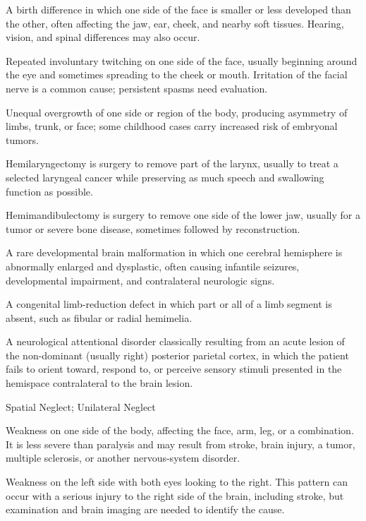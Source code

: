  A birth difference in which one side of the face is smaller or less developed than the other, often affecting the jaw, ear, cheek, and nearby soft tissues. Hearing, vision, and spinal differences may also occur.

 Repeated involuntary twitching on one side of the face, usually beginning around the eye and sometimes spreading to the cheek or mouth. Irritation of the facial nerve is a common cause; persistent spasms need evaluation.

 Unequal overgrowth of one side or region of the body, producing asymmetry of limbs, trunk, or face; some childhood cases carry increased risk of embryonal tumors.

 Hemilaryngectomy is surgery to remove part of the larynx, usually to treat a selected laryngeal cancer while preserving as much speech and swallowing function as possible.

 Hemimandibulectomy is surgery to remove one side of the lower jaw, usually for a tumor or severe bone disease, sometimes followed by reconstruction.

 A rare developmental brain malformation in which one cerebral hemisphere is abnormally enlarged and dysplastic, often causing infantile seizures, developmental impairment, and contralateral neurologic signs.

 A congenital limb-reduction defect in which part or all of a limb segment is absent, such as fibular or radial hemimelia.

 A neurological attentional disorder classically resulting from an acute lesion of the non-dominant (usually right) posterior parietal cortex, in which the patient fails to orient toward, respond to, or perceive sensory stimuli presented in the hemispace contralateral to the brain lesion.

\synonyms
Spatial Neglect; Unilateral Neglect

 Weakness on one side of the body, affecting the face, arm, leg, or a combination. It is less severe than paralysis and may result from stroke, brain injury, a tumor, multiple sclerosis, or another nervous-system disorder.

 Weakness on the left side with both eyes looking to the right. This pattern can occur with a serious injury to the right side of the brain, including stroke, but examination and brain imaging are needed to identify the cause.

